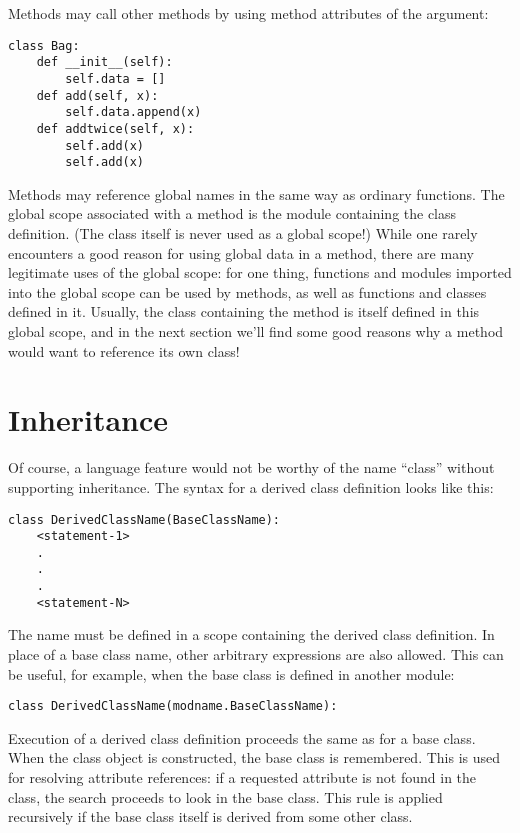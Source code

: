 \documentclass{manual}
\begin{document}
Methods may call other methods by using method attributes of the
 argument:

\begin{verbatim}
class Bag:
    def __init__(self):
        self.data = []
    def add(self, x):
        self.data.append(x)
    def addtwice(self, x):
        self.add(x)
        self.add(x)
\end{verbatim}

Methods may reference global names in the same way as ordinary
functions.  The global scope associated with a method is the module
containing the class definition.  (The class itself is never used as a
global scope!)  While one rarely encounters a good reason for using
global data in a method, there are many legitimate uses of the global
scope: for one thing, functions and modules imported into the global
scope can be used by methods, as well as functions and classes defined
in it.  Usually, the class containing the method is itself defined in
this global scope, and in the next section we'll find some good
reasons why a method would want to reference its own class!


\section{Inheritance \label{inheritance}}

Of course, a language feature would not be worthy of the name ``class''
without supporting inheritance.  The syntax for a derived class
definition looks like this:

\begin{verbatim}
class DerivedClassName(BaseClassName):
    <statement-1>
    .
    .
    .
    <statement-N>
\end{verbatim}

The name  must be defined in a scope containing
the derived class definition.  In place of a base class name, other
arbitrary expressions are also allowed.  This can be useful, for
example, when the base class is defined in another module:

\begin{verbatim}
class DerivedClassName(modname.BaseClassName):
\end{verbatim}

Execution of a derived class definition proceeds the same as for a
base class.  When the class object is constructed, the base class is
remembered.  This is used for resolving attribute references: if a
requested attribute is not found in the class, the search proceeds to look in the
base class.  This rule is applied recursively if the base class itself
is derived from some other class.
\end{document}
